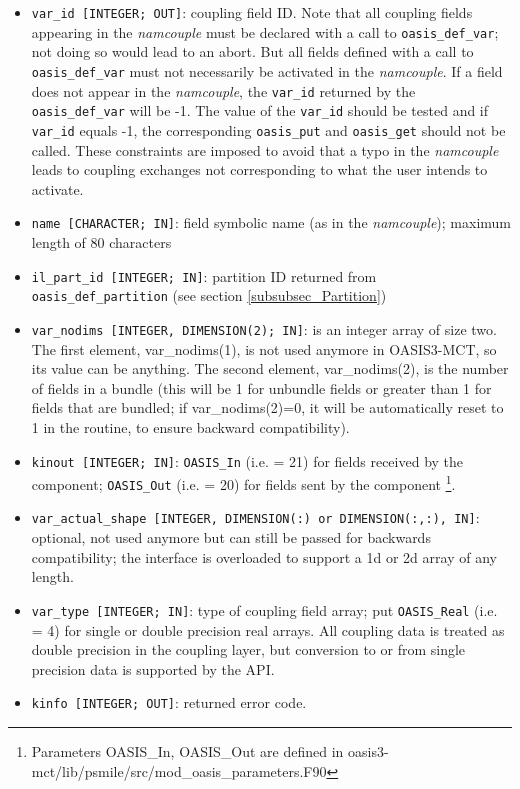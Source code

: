 \begin{itemize}
  \begin{itemize}
  \item {\tt var\_id [INTEGER; OUT]}: coupling field ID.  Note that all
      coupling fields appearing in the {\it namcouple} must be declared with
      a call to {\tt oasis\_def\_var}; not doing so would lead to an abort.
      But all fields defined with a call to {\tt oasis\_def\_var} must not necessarily
      be activated in the {\it namcouple}. If a field does not appear in the {\it namcouple},
      the {\tt var\_id} returned by the {\tt oasis\_def\_var} will be -1.
      The value of the {\tt var\_id} should be tested and if {\tt var\_id}
      equals -1, the corresponding
      {\tt oasis\_put} and {\tt oasis\_get} should not be called. These constraints are imposed to avoid that a typo in the {\it namcouple}
        leads to coupling exchanges not corresponding to what the user intends to activate.
  \item {\tt name [CHARACTER; IN]}: field symbolic name (as in the
    {\it namcouple}); maximum length of 80 characters
  \item {\tt il\_part\_id [INTEGER; IN]}: partition ID returned from {\tt oasis\_def\_partition} (see section
    \ref{subsubsec_Partition})
  \item {\tt var\_nodims [INTEGER, DIMENSION(2); IN]}: is an integer array of size two.
    The first element, var\_nodims(1), is not used anymore in OASIS3-MCT, so
    its value can be anything. The second element, var\_nodims(2),
    is the number of fields in a bundle (this will be 1 for unbundle
    fields or greater than 1 for fields that are bundled;
    if var\_nodims(2)=0, it will be automatically reset to 1 in the
    routine, to ensure backward compatibility).
  \item {\tt kinout [INTEGER; IN]}: {\tt OASIS\_In} 
    (i.e. = 21) for fields received by the component; {\tt OASIS\_Out}
    (i.e. = 20) for fields sent by the component
    \footnote{Parameters OASIS\_In, OASIS\_Out
      are defined in
      oasis3-mct/lib/psmile/src/mod\_oasis\_parameters.F90}.
  \item {\tt var\_actual\_shape [INTEGER, DIMENSION(:) or DIMENSION(:,:), IN]}: optional, not used anymore but can still be passed for
    backwards compatibility; the interface is overloaded to support a
    1d or 2d array of any length.
  \item {\tt var\_type [INTEGER; IN]}: type of coupling field array;
    put {\tt OASIS\_Real} (i.e. = 4) for single
    or double precision real arrays.  All coupling data is treated as
    double precision in the coupling layer, but conversion to or from
    single precision data is supported by the API.
  \item {\tt kinfo [INTEGER; OUT]}: returned error code.
  \end{itemize}
\end{itemize}

